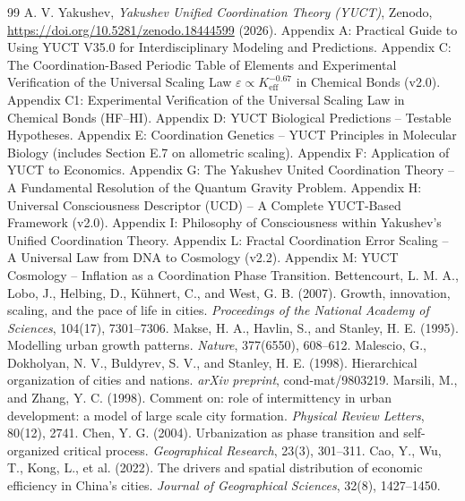 \documentclass[11pt]{article}
\theoremstyle{remark}
\begin{document}
	\begin{thebibliography}{99}
		A. V. Yakushev, \emph{Yakushev Unified Coordination Theory (YUCT)}, Zenodo, \url{https://doi.org/10.5281/zenodo.18444599} (2026).
		Appendix A: Practical Guide to Using YUCT V35.0 for Interdisciplinary Modeling and Predictions.
		Appendix C: The Coordination-Based Periodic Table of Elements and Experimental Verification of the Universal Scaling Law $\varepsilon \propto K_{\mathrm{eff}}^{-0.67}$ in Chemical Bonds (v2.0).
		Appendix C1: Experimental Verification of the Universal Scaling Law in Chemical Bonds (HF–HI).
		Appendix D: YUCT Biological Predictions – Testable Hypotheses.
		Appendix E: Coordination Genetics – YUCT Principles in Molecular Biology (includes Section E.7 on allometric scaling).
		Appendix F: Application of YUCT to Economics.
		Appendix G: The Yakushev United Coordination Theory – A Fundamental Resolution of the Quantum Gravity Problem.
		Appendix H: Universal Consciousness Descriptor (UCD) – A Complete YUCT‑Based Framework (v2.0).
		Appendix I: Philosophy of Consciousness within Yakushev's Unified Coordination Theory.
		Appendix L: Fractal Coordination Error Scaling – A Universal Law from DNA to Cosmology (v2.2).
		Appendix M: YUCT Cosmology – Inflation as a Coordination Phase Transition.
		Bettencourt, L. M. A., Lobo, J., Helbing, D., Kühnert, C., and West, G. B. (2007). Growth, innovation, scaling, and the pace of life in cities. \emph{Proceedings of the National Academy of Sciences}, 104(17), 7301–7306.
		Makse, H. A., Havlin, S., and Stanley, H. E. (1995). Modelling urban growth patterns. \emph{Nature}, 377(6550), 608–612.
		Malescio, G., Dokholyan, N. V., Buldyrev, S. V., and Stanley, H. E. (1998). Hierarchical organization of cities and nations. \emph{arXiv preprint}, cond-mat/9803219.
		Marsili, M., and Zhang, Y. C. (1998). Comment on: role of intermittency in urban development: a model of large scale city formation. \emph{Physical Review Letters}, 80(12), 2741.
		Chen, Y. G. (2004). Urbanization as phase transition and self-organized critical process. \emph{Geographical Research}, 23(3), 301–311.
		Cao, Y., Wu, T., Kong, L., et al. (2022). The drivers and spatial distribution of economic efficiency in China's cities. \emph{Journal of Geographical Sciences}, 32(8), 1427–1450.

\end{thebibliography}
\end{document}

